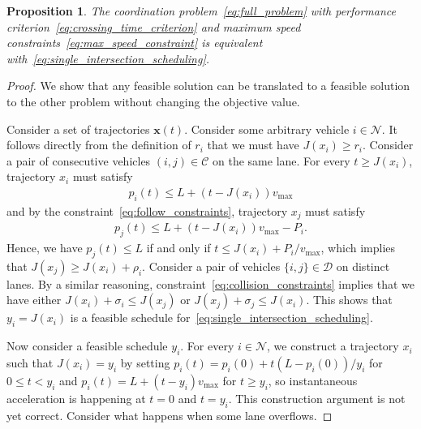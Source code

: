\documentclass[a4paper]{article}
\theoremstyle{definition}
\theoremstyle{plain}
\newtheorem{proposition}{Proposition}
\begin{document}
\begin{proposition}
  The coordination problem~\eqref{eq:full_problem} with performance criterion~\eqref{eq:crossing_time_criterion} and maximum speed
  constraints~\eqref{eq:max_speed_constraint} is equivalent with~\eqref{eq:single_intersection_scheduling}.
\end{proposition}
\begin{proof}
  We show that any feasible solution can be translated to a feasible solution to
  the other problem without changing the objective value.

  Consider a set of trajectories $\mathbf{x}(t)$. Consider some arbitrary
  vehicle $i \in \mathcal{N}$. It follows directly from the definition of $r_{i}$
  that we must have $J(x_{i}) \geq r_{i}$.
  Consider a pair of consecutive vehicles $(i,j) \in \mathcal{C}$ on the same
  lane. For every $t \geq J(x_{i})$, trajectory $x_{i}$ must satisfy
  \begin{align*}
    p_{i}(t) \leq L + (t - J(x_{i})) v_{\text{max}}
  \end{align*}
  and by the constraint~\eqref{eq:follow_constraints}, trajectory $x_{j}$ must satisfy
  \begin{align*}
    p_{j}(t) \leq L + (t - J(x_{i})) v_{\text{max}} - P_{i} .
  \end{align*}
  Hence, we have $p_{j}(t) \leq L$ if and only if
  $t \leq J(x_{i}) + P_{i} / v_{\text{max}}$, which implies that
  $J(x_{j}) \geq J(x_{i}) + \rho_{i}$.
  Consider a pair of vehicles $\{i, j\} \in \mathcal{D}$ on distinct lanes. By a
  similar reasoning, constraint~\eqref{eq:collision_constraints} implies that we have either
  $J(x_{i}) + \sigma_{i} \leq J(x_{j})$ or $J(x_{j}) + \sigma_{j} \leq J(x_{i})$.
  This shows that $y_{i} = J(x_{i})$ is a feasible schedule for~\eqref{eq:single_intersection_scheduling}.

  Now consider a feasible schedule $y_{i}$. For every $i \in \mathcal{N}$, we
  construct a trajectory $x_{i}$ such that $J(x_{i}) = y_{i}$ by setting
  $p_{i}(t) = p_{i}(0) + t (L - p_{i}(0)) / y_{i}$ for $0 \leq t < y_{i}$ and
  $p_{i}(t) = L + (t - y_{i}) v_{\text{max}}$ for $t \geq y_{i}$, so
  instantaneous acceleration is happening at $t=0$ and $t=y_{i}$.
  {\color{blue} This construction argument is not yet correct. Consider what happens when some lane overflows.}
\end{proof}
\end{document}
